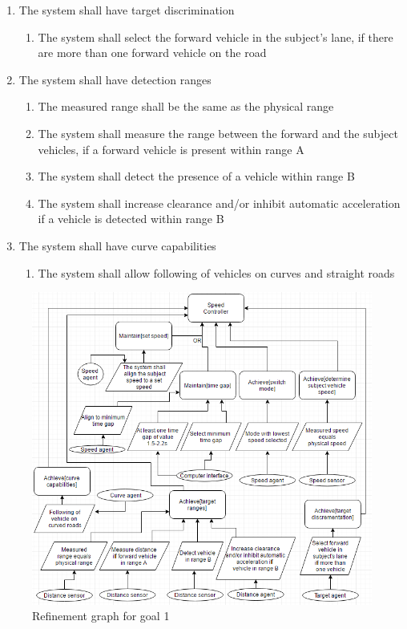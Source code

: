 \begin{enumerate}
\begin{enumerate}[label*=\arabic*]
\begin{enumerate}[label*=\arabic*]
        \end{enumerate}
        \item{The system shall have target discrimination}
        \begin{enumerate}[label*=\arabic*]
            \item{The system shall select the forward vehicle in the subject’s lane, if there are more than one forward vehicle on the road}
        \end{enumerate}
        \item{The system shall have detection ranges}
        \begin{enumerate}[label*=\arabic*]
            \item{The measured range shall be the same as the physical range}
            \item{The system shall measure the range between the forward and the subject vehicles, if a forward vehicle is present within range A}
            \item{The system shall detect the presence of a vehicle within range B}
            \item{The system shall increase clearance and/or inhibit automatic acceleration if a vehicle is detected within range B}
        \end{enumerate}
        \item{The system shall have curve capabilities}
        \begin{enumerate}[label*=\arabic*]
            \item The system shall allow following of vehicles on curves and straight roads
        \end{enumerate}
    \end{enumerate}
\end{enumerate}

\begin{figure}[H]
    \centering
    \includegraphics[width=\textwidth]{images/goal1_graph}
    \caption{Refinement graph for goal 1}
    \label{fig:graph_1}
\end{figure}

